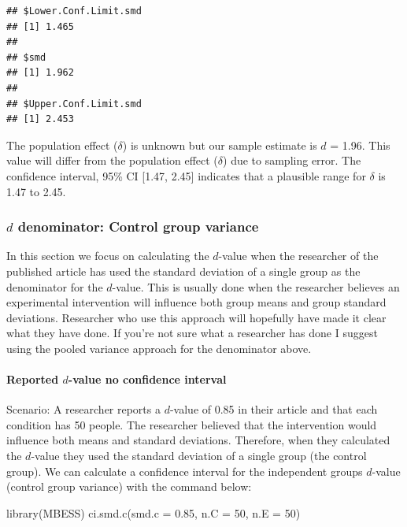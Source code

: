 \documentclass[
]{krantz}
\makeatletter
\newenvironment{Shaded}{\begin{snugshade}}{\end{snugshade}}
\newcommand{\AttributeTok}[1]{\textcolor[rgb]{0.61,0.61,0.61}{#1}}
\newcommand{\DecValTok}[1]{\textcolor[rgb]{0.06,0.06,0.06}{#1}}
\newcommand{\FloatTok}[1]{\textcolor[rgb]{0.06,0.06,0.06}{#1}}
\newcommand{\FunctionTok}[1]{\textcolor[rgb]{0,0,0}{#1}}
\newcommand{\NormalTok}[1]{#1}
\newenvironment{kframe}{%
\medskip{}
\setlength{\fboxsep}{.8em}
 \def\at@end@of@kframe{}%
 \ifinner\ifhmode%
  \def\at@end@of@kframe{\end{minipage}}%
  \begin{minipage}{\columnwidth}%
 \fi\fi%
 \def\FrameCommand##1{\hskip\@totalleftmargin \hskip-\fboxsep
 \colorbox{shadecolor}{##1}\hskip-\fboxsep
     \hskip-\linewidth \hskip-\@totalleftmargin \hskip\columnwidth}%
 \MakeFramed {\advance\hsize-\width
   \@totalleftmargin\z@ \linewidth\hsize
   \@setminipage}}%
 {\par\unskip\endMakeFramed%
 \at@end@of@kframe}
\renewenvironment{Shaded}{\begin{kframe}}{\end{kframe}}
\makeatother
\begin{document}
\begin{verbatim}
## $Lower.Conf.Limit.smd
## [1] 1.465
## 
## $smd
## [1] 1.962
## 
## $Upper.Conf.Limit.smd
## [1] 2.453
\end{verbatim}

The population effect (\(\delta\)) is unknown but our sample estimate is \(d\) = 1.96. This value will differ from the population effect (\(\delta\)) due to sampling error. The confidence interval, 95\% CI {[}1.47, 2.45{]} indicates that a plausible range for \(\delta\) is 1.47 to 2.45.

\hypertarget{d-denominator-control-group-variance}{%
\subsubsection{\texorpdfstring{\(d\) denominator: Control group variance}{d denominator: Control group variance}}\label{d-denominator-control-group-variance}}

In this section we focus on calculating the \(d\)-value when the researcher of the published article has used the standard deviation of a single group as the denominator for the \(d\)-value. This is usually done when the researcher believes an experimental intervention will influence both group means and group standard deviations. Researcher who use this approach will hopefully have made it clear what they have done. If you're not sure what a researcher has done I suggest using the pooled variance approach for the denominator above.

\hypertarget{reported-d-value-no-confidence-interval-1}{%
\paragraph{\texorpdfstring{Reported \(d\)-value no confidence interval}{Reported d-value no confidence interval}}\label{reported-d-value-no-confidence-interval-1}}

Scenario: A researcher reports a \(d\)-value of 0.85 in their article and that each condition has 50 people. The researcher believed that the intervention would influence both means and standard deviations. Therefore, when they calculated the \(d\)-value they used the standard deviation of a single group (the control group). We can calculate a confidence interval for the independent groups \(d\)-value (control group variance) with the command below:

\begin{Shaded}
\begin{Highlighting}[]
\FunctionTok{library}\NormalTok{(MBESS)}
\FunctionTok{ci.smd.c}\NormalTok{(}\AttributeTok{smd.c =} \FloatTok{0.85}\NormalTok{, }\AttributeTok{n.C =} \DecValTok{50}\NormalTok{, }\AttributeTok{n.E =} \DecValTok{50}\NormalTok{) }
\end{Highlighting}
\end{Shaded}
\end{document}
